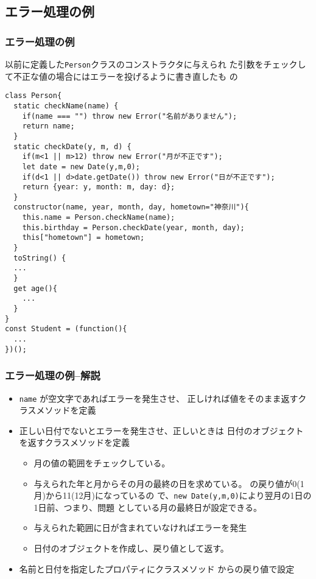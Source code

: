 \subsection{エラー処理の例}
\begin{frame}[containsverbatim]
 \frametitle{エラー処理の例}
以前に定義した\texttt{Person}クラスのコンストラクタに与えられ
	た引数をチェックして不正な値の場合にはエラーを投げるように書き直したも
 の
 {\scriptsize
\begin{Verbatim}
class Person{
  static checkName(name) {
    if(name === "") throw new Error("名前がありません");
    return name;
  }
  static checkDate(y, m, d) {
    if(m<1 || m>12) throw new Error("月が不正です");
    let date = new Date(y,m,0);
    if(d<1 || d>date.getDate()) throw new Error("日が不正です");
    return {year: y, month: m, day: d};
  }
  constructor(name, year, month, day, hometown="神奈川"){
    this.name = Person.checkName(name);
    this.birthday = Person.checkDate(year, month, day);
    this["hometown"] = hometown;
  }
  toString() {
  ...
  }
  get age(){
    ...
  }
}
const Student = (function(){
  ...
})();
\end{Verbatim}
 }
\end{frame}
\begin{frame}[containsverbatim]
 \frametitle{エラー処理の例--解説}
\begin{itemize}
 \item \texttt{name} が空文字であればエラーを発生させ、
       正しければ値をそのまま返すクラスメソッドを定義
 \item 正しい日付でないとエラーを発生させ、正しいときは
       日付のオブジェクトを返すクラスメソッドを定義
       \begin{itemize}
        \item 月の値の範囲をチェックしている。
 \item 与えられた年と月からその月の最終の日を求めている。
			 の戻り値が0(1月)から11(12月)になっているの
			 で、\texttt{new Date(y,m,0)}により翌月の1日の1日前、つまり、問題
			 としている月の最終日が設定できる。
 \item 与えられた範囲に日が含まれていなければエラーを発生
        \item 日付のオブジェクトを作成し、戻り値として返す。
       \end{itemize}
 \item 名前と日付を指定したプロパティにクラスメソッド
       からの戻り値で設定
\end{itemize}
\end{frame}
